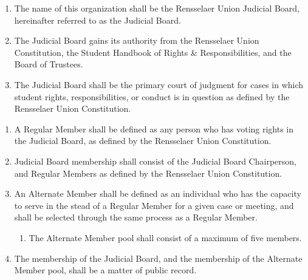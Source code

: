 

\begin{enumerate}
\item The name of this organization shall be the Rensselaer Union Judicial Board, hereinafter referred to as the Judicial Board.
\item The Judicial Board gains its authority from the Rensselaer Union Constitution, the Student Handbook of Rights \& Responsibilities, and the Board of Trustees.
\item The Judicial Board shall be the primary court of judgment for cases in which student rights, responsibilities, or conduct is in question as defined by the Rensselaer Union Constitution.
\end{enumerate}


\begin{enumerate}
\item A Regular Member shall be defined as any person who has voting rights in the Judicial Board, as defined by the Rensselaer Union Constitution.
\item Judicial Board membership shall consist of the Judicial Board Chairperson, and Regular Members as defined by the Rensselaer Union Constitution.
\item An Alternate Member shall be defined as an individual who has the capacity to serve in the stead of a Regular Member for a given case or meeting, and shall be selected through the same process as a Regular Member.
  \begin{enumerate}
  \item The Alternate Member pool shall consist of a maximum of five members.
  \end{enumerate}
\item The membership of the Judicial Board, and the membership of the Alternate Member pool, shall be a matter of public record.
\end{enumerate}


